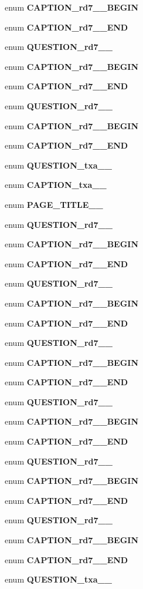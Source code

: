 \begin{CompactItemize}
\item 
enum {\bf CAPTION\_\-rd7\_\_\-BEGIN} 
\item 
enum {\bf CAPTION\_\-rd7\_\_\-END} 
\item 
enum {\bf QUESTION\_\-rd7\_\_\-} 
\item 
enum {\bf CAPTION\_\-rd7\_\_\-BEGIN} 
\item 
enum {\bf CAPTION\_\-rd7\_\_\-END} 
\item 
enum {\bf QUESTION\_\-rd7\_\_\-} 
\item 
enum {\bf CAPTION\_\-rd7\_\_\-BEGIN} 
\item 
enum {\bf CAPTION\_\-rd7\_\_\-END} 
\item 
enum {\bf QUESTION\_\-txa\_\_\-} 
\item 
enum {\bf CAPTION\_\-txa\_\_\-} 
\item 
enum {\bf PAGE\_\-TITLE\_\_\-} 
\item 
enum {\bf QUESTION\_\-rd7\_\_\-} 
\item 
enum {\bf CAPTION\_\-rd7\_\_\-BEGIN} 
\item 
enum {\bf CAPTION\_\-rd7\_\_\-END} 
\item 
enum {\bf QUESTION\_\-rd7\_\_\-} 
\item 
enum {\bf CAPTION\_\-rd7\_\_\-BEGIN} 
\item 
enum {\bf CAPTION\_\-rd7\_\_\-END} 
\item 
enum {\bf QUESTION\_\-rd7\_\_\-} 
\item 
enum {\bf CAPTION\_\-rd7\_\_\-BEGIN} 
\item 
enum {\bf CAPTION\_\-rd7\_\_\-END} 
\item 
enum {\bf QUESTION\_\-rd7\_\_\-} 
\item 
enum {\bf CAPTION\_\-rd7\_\_\-BEGIN} 
\item 
enum {\bf CAPTION\_\-rd7\_\_\-END} 
\item 
enum {\bf QUESTION\_\-rd7\_\_\-} 
\item 
enum {\bf CAPTION\_\-rd7\_\_\-BEGIN} 
\item 
enum {\bf CAPTION\_\-rd7\_\_\-END} 
\item 
enum {\bf QUESTION\_\-rd7\_\_\-} 
\item 
enum {\bf CAPTION\_\-rd7\_\_\-BEGIN} 
\item 
enum {\bf CAPTION\_\-rd7\_\_\-END} 
\item 
enum {\bf QUESTION\_\-txa\_\_\-} 

\end{CompactItemize}

